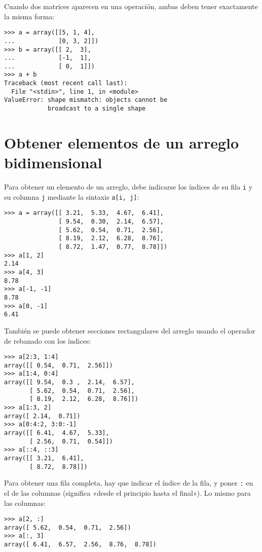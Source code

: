 Cuando dos matrices aparecen en una operación, ambas deben tener
exactamente la misma forma:

\begin{lstlisting}
>>> a = array([[5, 1, 4],
...            [0, 3, 2]])
>>> b = array([[ 2,  3],
...            [-1,  1],
...            [ 0,  1]])
>>> a + b
Traceback (most recent call last):
  File "<stdin>", line 1, in <module>
ValueError: shape mismatch: objects cannot be
            broadcast to a single shape
\end{lstlisting}

\section{Obtener elementos de un arreglo bidimensional}

Para obtener un elemento de un arreglo, debe indicarse los índices de su
fila \lstinline!i! y su columna \lstinline!j! mediante la sintaxis
\lstinline!a[i, j]!:

\begin{lstlisting}
>>> a = array([[ 3.21,  5.33,  4.67,  6.41],
               [ 9.54,  0.30,  2.14,  6.57],
               [ 5.62,  0.54,  0.71,  2.56],
               [ 8.19,  2.12,  6.28,  8.76],
               [ 8.72,  1.47,  0.77,  8.78]])
>>> a[1, 2]
2.14
>>> a[4, 3]
8.78
>>> a[-1, -1]
8.78
>>> a[0, -1]
6.41
\end{lstlisting}

También se puede obtener secciones rectangulares del arreglo usando el
operador de rebanado con los índices:

\begin{lstlisting}
>>> a[2:3, 1:4]
array([[ 0.54,  0.71,  2.56]])
>>> a[1:4, 0:4]
array([[ 9.54,  0.3 ,  2.14,  6.57],
       [ 5.62,  0.54,  0.71,  2.56],
       [ 8.19,  2.12,  6.28,  8.76]])
>>> a[1:3, 2]
array([ 2.14,  0.71])
>>> a[0:4:2, 3:0:-1]
array([[ 6.41,  4.67,  5.33],
       [ 2.56,  0.71,  0.54]])
>>> a[::4, ::3]
array([[ 3.21,  6.41],
       [ 8.72,  8.78]])
\end{lstlisting}

Para obtener una fila completa, hay que indicar el índice de la fila, y
poner \lstinline!:! en el de las columnas (significa «desde el principio
hasta el final»). Lo mismo para las columnas:

\begin{lstlisting}
>>> a[2, :]
array([ 5.62,  0.54,  0.71,  2.56])
>>> a[:, 3]
array([ 6.41,  6.57,  2.56,  8.76,  8.78])
\end{lstlisting}

